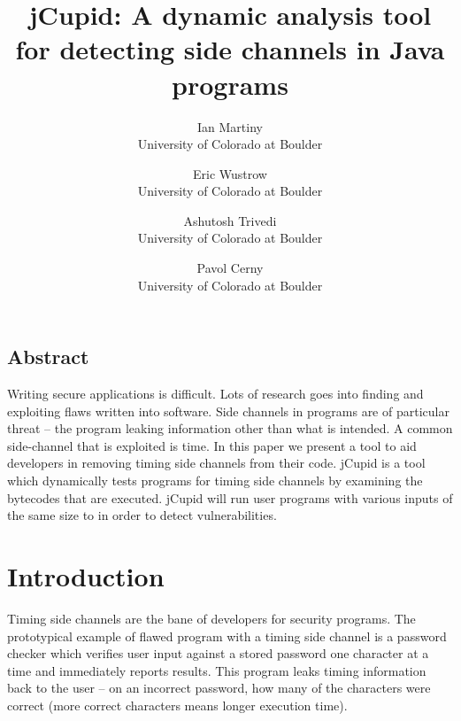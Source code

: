\documentclass[letterpaper,twocolumn,10pt]{article}
\begin{document}
\date{}

\title{\Large \bf jCupid: A dynamic analysis tool for detecting side channels in Java programs}

\author{
{\rm Ian Martiny}\\
University of Colorado at Boulder
\and
{\rm Eric Wustrow}\\
University of Colorado at Boulder
\and
{\rm Ashutosh Trivedi}\\
University of Colorado at Boulder
\and
{\rm Pavol Cerny}\\
University of Colorado at Boulder
} %

\maketitle

\thispagestyle{empty}


\subsection*{Abstract} Writing secure applications is difficult. Lots of
research goes into finding and exploiting flaws written into software. Side
channels in programs are of particular threat -- the program leaking
information other than what is intended. A common side-channel that is
exploited is time. In this paper we present a tool to aid developers in
removing timing side channels from their code. jCupid is a tool which
dynamically tests programs for timing side channels by examining the bytecodes
that are executed. jCupid will run user programs with various inputs of the
same size to in order to detect vulnerabilities.



\section{Introduction}

Timing side channels are the bane of developers for security programs. The prototypical example of flawed program with a timing side channel is a password checker which verifies user input against a stored password one character at a time and immediately reports results. This program leaks timing information back to the user -- on an incorrect password, how many of the characters were correct (more correct characters means longer execution time).
\end{document}
